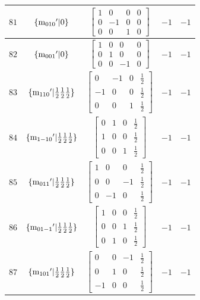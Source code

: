 \documentclass[fleqn,8pt]{jsarticle}
\begin{document}
\begin{longtable}{ccccc}
$ 81 $ & $ \{{\rm m}_{010}{}'|0\} $ & $ \begin{bmatrix} 1 & 0 & 0 & 0 \\ 0 & -1 & 0 & 0 \\ 0 & 0 & 1 & 0 \end{bmatrix} $ & $ -1 $ & $ -1 $ \\ \hline
$ 82 $ & $ \{{\rm m}_{001}{}'|0\} $ & $ \begin{bmatrix} 1 & 0 & 0 & 0 \\ 0 & 1 & 0 & 0 \\ 0 & 0 & -1 & 0 \end{bmatrix} $ & $ -1 $ & $ -1 $ \\ \hline
$ 83 $ & $ \{{\rm m}_{110}{}'|\frac{1}{2} \frac{1}{2} \frac{1}{2}\} $ & $ \begin{bmatrix} 0 & -1 & 0 & \frac{1}{2} \\ -1 & 0 & 0 & \frac{1}{2} \\ 0 & 0 & 1 & \frac{1}{2} \end{bmatrix} $ & $ -1 $ & $ -1 $ \\ \hline
$ 84 $ & $ \{{\rm m}_{1-10}{}'|\frac{1}{2} \frac{1}{2} \frac{1}{2}\} $ & $ \begin{bmatrix} 0 & 1 & 0 & \frac{1}{2} \\ 1 & 0 & 0 & \frac{1}{2} \\ 0 & 0 & 1 & \frac{1}{2} \end{bmatrix} $ & $ -1 $ & $ -1 $ \\ \hline
$ 85 $ & $ \{{\rm m}_{011}{}'|\frac{1}{2} \frac{1}{2} \frac{1}{2}\} $ & $ \begin{bmatrix} 1 & 0 & 0 & \frac{1}{2} \\ 0 & 0 & -1 & \frac{1}{2} \\ 0 & -1 & 0 & \frac{1}{2} \end{bmatrix} $ & $ -1 $ & $ -1 $ \\ \hline
$ 86 $ & $ \{{\rm m}_{01-1}{}'|\frac{1}{2} \frac{1}{2} \frac{1}{2}\} $ & $ \begin{bmatrix} 1 & 0 & 0 & \frac{1}{2} \\ 0 & 0 & 1 & \frac{1}{2} \\ 0 & 1 & 0 & \frac{1}{2} \end{bmatrix} $ & $ -1 $ & $ -1 $ \\ \hline
$ 87 $ & $ \{{\rm m}_{101}{}'|\frac{1}{2} \frac{1}{2} \frac{1}{2}\} $ & $ \begin{bmatrix} 0 & 0 & -1 & \frac{1}{2} \\ 0 & 1 & 0 & \frac{1}{2} \\ -1 & 0 & 0 & \frac{1}{2} \end{bmatrix} $ & $ -1 $ & $ -1 $ \\ \hline

\end{longtable}
\end{document}
